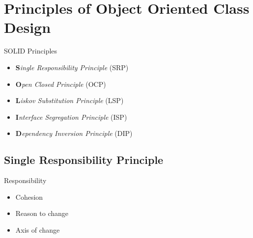 \documentclass[xcolor=svgnames]{beamer}
\begin{document}

\section[Class Design]{Principles of Object Oriented Class Design}


\begin{frame}{\secname}
    SOLID Principles
    \begin{itemize}
        \pause \item \textbf{S}\textit{ingle Responsibility Principle} (SRP)
        \pause \item \textbf{O}\textit{pen Closed Principle} (OCP)
        \pause \item \textbf{L}\textit{iskov Substitution Principle} (LSP)
        \pause \item \textbf{I}\textit{nterface Segregation Principle} (ISP)
        \pause \item \textbf{D}\textit{ependency Inversion Principle} (DIP)
    \end{itemize}
\end{frame}


\subsection{Single Responsibility Principle}


\begin{frame}{\subsecname}

    Responsibility
    \begin{itemize}
        \pause \item Cohesion
        \pause \item Reason to change
        \pause \item Axis of change
    \end{itemize}

\end{frame}


\begin{frame}{\subsecname}

    \begin{minipage}{\columnwidth}
    \end{minipage}

\end{frame}
\end{document}
